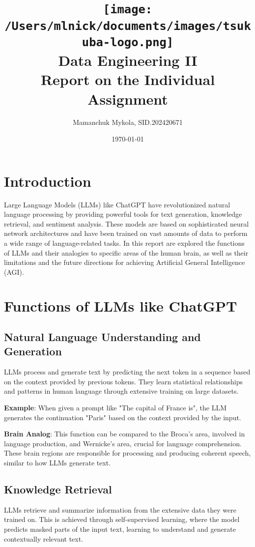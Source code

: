 \documentclass[a4paper,10.5pt]{article}
\title{
    \texttt{[image: /Users/mlnick/documents/images/tsukuba-logo.png]} \\
    \textbf{Data Engineering II} \\
    \vspace{3mm}    
    Report on the Individual Assignment
}
\author{Mamanchuk Mykola, SID.202420671}
\date{\today}
\begin{document}
\maketitle

\section{Introduction}
Large Language Models (LLMs) like ChatGPT have revolutionized natural language processing by providing powerful tools for text generation, knowledge retrieval, and sentiment analysis. These models are based on sophisticated neural network architectures and have been trained on vast amounts of data to perform a wide range of language-related tasks. In this report are explored the functions of LLMs and their analogies to specific areas of the human brain, as well as their limitations and the future directions for achieving Artificial General Intelligence (AGI).

\section{Functions of LLMs like ChatGPT}

\subsection{Natural Language Understanding and Generation}
LLMs process and generate text by predicting the next token in a sequence based on the context provided by previous tokens. They learn statistical relationships and patterns in human language through extensive training on large datasets.

\textbf{Example}: When given a prompt like "The capital of France is", the LLM generates the continuation "Paris" based on the context provided by the input.

\textbf{Brain Analog}: This function can be compared to the Broca's area, involved in language production, and Wernicke's area, crucial for language comprehension. These brain regions are responsible for processing and producing coherent speech, similar to how LLMs generate text.

\subsection{Knowledge Retrieval}
LLMs retrieve and summarize information from the extensive data they were trained on. This is achieved through self-supervised learning, where the model predicts masked parts of the input text, learning to understand and generate contextually relevant text.
\end{document}
